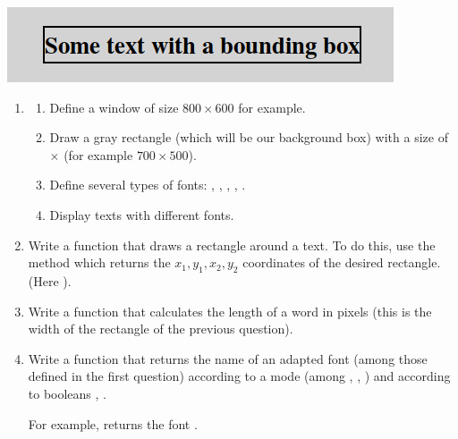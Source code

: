 \documentclass[11pt,class=report,crop=false]{standalone}
\begin{document}
\begin{activite}


\begin{center}
\includegraphics[scale=0.6]{screen-markdown-2-en}
\end{center}

\begin{enumerate}
  \item 
  \begin{enumerate}
    \item Define a window  of size $800 \times 600$ for example.

    \item Draw a gray rectangle (which will be our background box) with a size of  $\times$  (for example $700 \times 500$).

    \item Define several types of fonts: , , , , .
    
    \item Display texts with different fonts.
  \end{enumerate}
    
  \item Write a function  that draws a rectangle around a text. To do this, use the  method which returns the $x_1,y_1,x_2,y_2$ coordinates of the desired rectangle. (Here ).
  
  \item Write a function  that calculates the length of a word in pixels (this is the width of the rectangle of the previous question).
  
  \item Write a function  that returns the name of an adapted font (among those defined in the first question) according to a mode (among , , ) and according to booleans , .
  
  For example,  returns the font .
\end{enumerate}

\end{activite}
\end{document}
